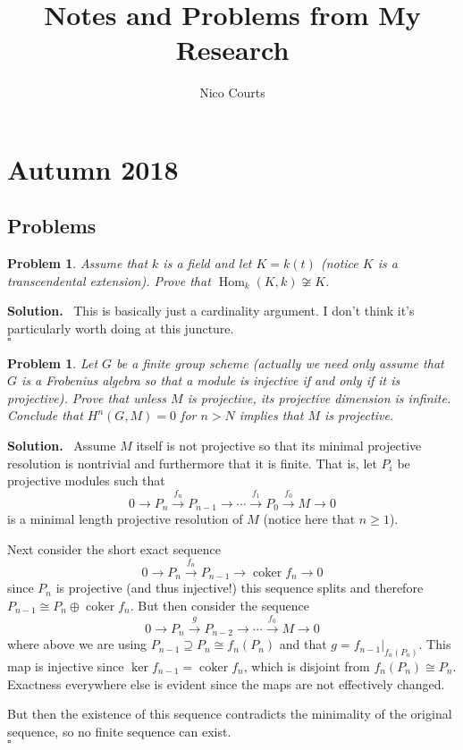 \documentclass[12pt]{article}
\DeclareMathOperator{\Hom}{Hom}
\DeclareMathOperator{\coker}{coker}
\newtheorem{pro}[lem]{Problem}
\newenvironment{prob}{\par\smallskip
	\noindent\begin{mdframed}\small \begin{pro}}{\end{pro}\end{mdframed}\medskip}
\newenvironment{sol}{\noindent \textbf{Solution.} \,}{\\\hspace*{\fill}$\square$\medskip}
\begin{document}
\title{ Notes and Problems from My Research\vspace{-1ex}}
\author{Nico Courts}
\date{}
\maketitle


\section{Autumn 2018}
\subsection{Problems}
\begin{prob}
	Assume that $k$ is a field and let $K=k(t)$ (notice $K$ is a transcendental extension). Prove that $\Hom_k(K,k)\not\cong K$.
\end{prob}

\begin{sol}
	This is basically just a cardinality argument. I don't think it's particularly worth doing at this juncture.
\end{sol}

\begin{prob}
	Let $G$ be a finite group scheme (actually we need only assume that $G$ is a Frobenius algebra so that a module
	is injective if and only if it is projective). Prove that unless $M$ is projective, its projective dimension is 
	infinite. Conclude that $H^n(G,M)=0$ for $n>N$ implies that $M$ is projective.
\end{prob}
\begin{sol}
	Assume $M$ itself is not projective so that its minimal projective resolution is nontrivial and furthermore
	that it is finite. That is, let $P_i$ be projective modules such that
	\[0\to P_n\xrightarrow{f_n} P_{n-1}\to\cdots \xrightarrow{f_{1}}P_0\xrightarrow{f_0} M\to 0\]
	is a minimal length projective resolution of $M$ (notice here that $n\ge 1$). 
	
	Next consider the short exact sequence
	\[0\to P_n\xrightarrow{f_n}P_{n-1}\to \coker f_n\to 0\]
	since $P_n$ is projective (and thus injective!) this sequence splits and therefore $P_{n-1}\cong P_n\oplus\coker f_n.$
	But then consider the sequence
	\[0\to P_n\xrightarrow{g} P_{n-2}\to\cdots\xrightarrow{f_0}M\to 0\]
	where above we are using $P_{n-1}\supseteq P_n\cong f_n(P_n)$  and that
	$g=f_{n-1}|_{f_n(P_n)}$. This map is injective since $\ker f_{n-1}=\coker f_n$, which is disjoint
	from $f_n(P_n)\cong P_n$. Exactness everywhere else is evident since the maps are not effectively changed.

	But then the existence of this sequence contradicts the minimality of the original sequence, so
	no finite sequence can exist.
\end{sol}
\end{document}
